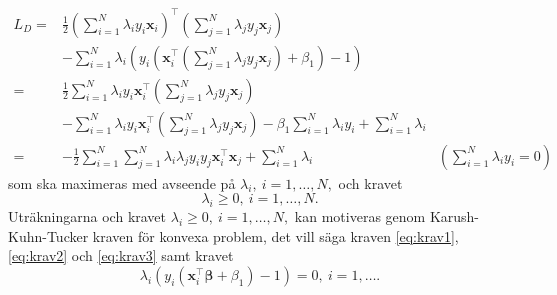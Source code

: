 \documentclass[a4paper, 12pt]{report}
\theoremstyle{definition}
\theoremstyle{remark}
\newcommand{\bfbeta}{{\boldsymbol{\beta}}}
\begin{document}
\begin{equation*}
\begin{aligned}
	L_D=&\frac{1}{2}\left(\sum_{i=1}^{N}\lambda_i y_i \mathbf{x}_i\right)^\intercal \left(\sum_{j=1}^{N}\lambda_j y_j \mathbf{x}_j\right)&\\
	&- \sum_{i=1}^{N}\lambda_i \left(y_i\left(\mathbf{x}_i^\intercal \left(\sum_{j=1}^{N} \lambda_j y_j \mathbf{x}_j\right) +\beta_1 \right) -1\right)&\\
	=& \frac{1}{2} \sum_{i=1}^{N} \lambda_i y_i \mathbf{x}_i^\intercal\left(\sum_{j=1}^{N} \lambda_j y_j \mathbf{x}_j\right) &\\
	&- \sum_{i=1}^{N}\lambda_i y_i \mathbf{x}_i^\intercal \left(\sum_{j=1}^{N} \lambda_j y_j \mathbf{x}_j\right) - \beta_1 \sum_{i=1}^{N} \lambda_i y_i  + \sum_{i=1}^{N} \lambda_i&\\
	=& -\frac{1}{2} \sum_{i=1}^{N} \sum_{j=1}^{N} \lambda_i \lambda_j y_i y_j \mathbf{x}_i^\intercal \mathbf{x}_j + \sum_{i=1}^{N} \lambda_i &\textstyle{\left(\sum\limits_{i=1}^{N}\lambda_iy_i = 0\right)}
\end{aligned}
\end{equation*}
som ska maximeras med avseende på $\lambda_i,~i=1,\dots,N,$ och kravet \begin{equation}\label{eq:krav3}
	\lambda_i\geq 0,~i=1,\dots,N.
\end{equation} Uträkningarna och kravet $\lambda_i\geq 0,~i=1,\dots,N,$ kan motiveras genom Karush-Kuhn-Tucker kraven för konvexa problem, det vill säga kraven \ref{eq:krav1}, \ref{eq:krav2} och \ref{eq:krav3} samt kravet
\begin{equation}\label{eq:krav4}
	\lambda_i\left( y_i\left( \mathbf{x}_i^\intercal \bfbeta + \beta_1 \right) -1 \right) = 0,~i=1,\dots.
\end{equation}
\end{document}
